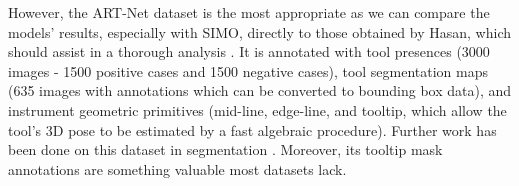 
However, the ART-Net dataset is the most appropriate as we can compare the models' results, especially with SIMO, directly to those obtained by Hasan, which should assist in a thorough analysis \cite{hasan_detection_2021}. It is annotated with tool presences (3000 images - 1500 positive cases and 1500 negative cases), tool segmentation maps (635 images with annotations which can be converted to bounding box data), and instrument geometric primitives (mid-line, edge-line, and tooltip, which allow the tool's 3D pose to be estimated by a fast algebraic procedure). Further work has been done on this dataset in segmentation \cite{lou_min-max_2022, rabbani_can_2024}. Moreover, its tooltip mask annotations are something valuable most datasets lack. 



